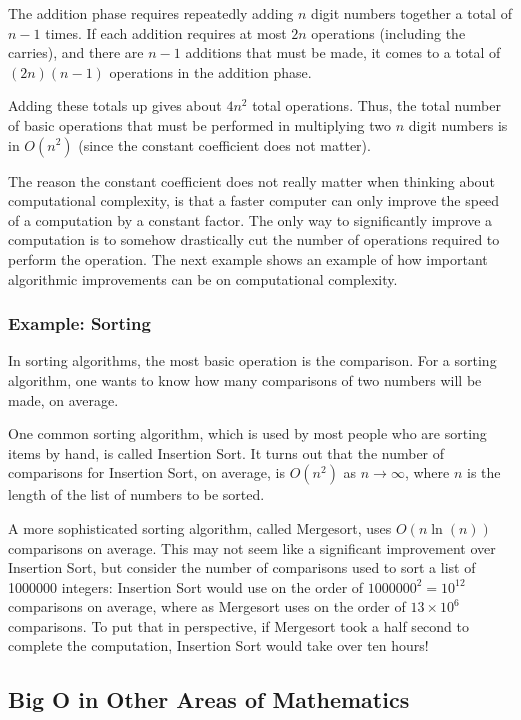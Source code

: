 \documentclass[twoside,openright,titlepage,a4paper]{book}
\begin{document}
\begin{sloppypar}
The addition phase requires repeatedly adding $n$ digit numbers together a total of $n-1$ times. If each addition requires at most $2n$ operations (including the carries), and there are $n-1$ additions that must be made, it comes to a total of $(2n)(n-1)$ operations in the addition phase.

Adding these totals up gives about $4n^2$ total operations. Thus, the total number of basic operations that must be performed in multiplying two $n$ digit numbers is in $O(n^2)$ (since the constant coefficient does not matter).

The reason the constant coefficient does not really matter when thinking about computational complexity, is that a faster computer can only improve the speed of a computation by a constant factor. The only way to significantly improve a computation is to somehow drastically cut the number of operations required to perform the operation. The next example shows an example of how important algorithmic improvements can be on computational complexity.

\subsubsection{Example: Sorting}

In sorting algorithms, the most basic operation is the comparison. For a sorting algorithm, one wants to know how many comparisons of two numbers will be made, on average.

One common sorting algorithm, which is used by most people who are sorting items by hand, is called Insertion Sort. It turns out that the number of comparisons for Insertion Sort, on average, is $O(n^2)$ as $n \rightarrow \infty$, where $n$ is the length of the list of numbers to be sorted.

A more sophisticated sorting algorithm, called Mergesort, uses $O(n\ln(n))$ comparisons on average. This may not seem like a significant improvement over Insertion Sort, but consider the number of comparisons used to sort a list of 1000000 integers: Insertion Sort would use on the order of $1000000^2 = 10^{12}$ comparisons on average, where as Mergesort uses on the order of $13 \times 10^6$ comparisons. To put that in perspective, if Mergesort took a half second to complete the computation, Insertion Sort would take over ten hours!

\subsection{Big O in Other Areas of Mathematics}


\end{sloppypar}
\end{document}
